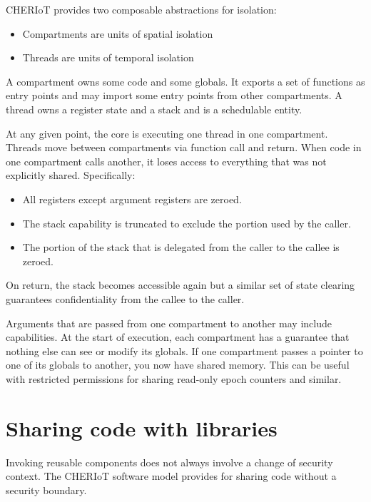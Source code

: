 CHERIoT provides two composable abstractions for isolation:

\begin{itemize}
	\item{Compartments are units of spatial isolation}
	\item{Threads are units of temporal isolation}
\end{itemize}

A compartment owns some code and some globals.
It exports a set of functions as entry points and may import some entry points from other compartments.
A thread owns a register state and a stack and is a schedulable entity.

At any given point, the core is executing one thread in one compartment.
Threads move between compartments via function call and return.
When code in one compartment calls another, it loses access to everything that was not explicitly shared.
Specifically:

\begin{itemize}
	\item{All registers except argument registers are zeroed.}
	\item{The stack capability is truncated to exclude the portion used by the caller.}
	\item{The portion of the stack that is delegated from the caller to the callee is zeroed.}
\end{itemize}

On return, the stack becomes accessible again but a similar set of state clearing guarantees confidentiality from the callee to the caller.

Arguments that are passed from one compartment to another may include capabilities.
At the start of execution, each compartment has a guarantee that nothing else can see or modify its globals.
If one compartment passes a pointer to one of its globals to another, you now have shared memory.
This can be useful with restricted permissions for sharing read-only epoch counters and similar.

\section[label=libraries]{Sharing code with libraries}

Invoking reusable components does not always involve a change of security context.
The CHERIoT software model provides  for sharing code without a security boundary.

